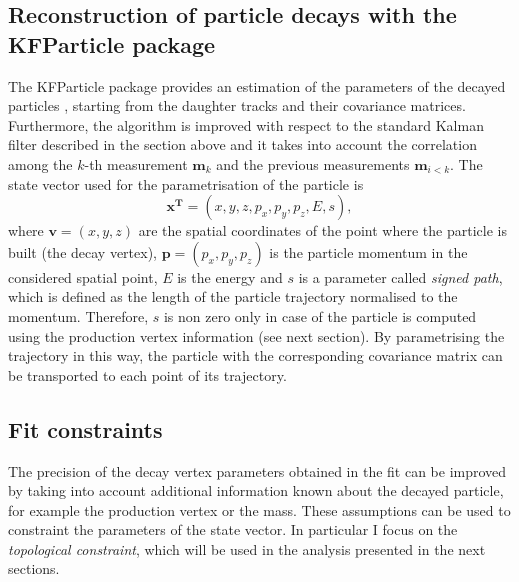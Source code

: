 \documentclass[b5paper,10pt,twoside,oldstyle,classica]{toptesi}
\begin{document}
\subsection{Reconstruction of particle decays with the KFParticle package}
\label{KFParticle_sec}
The KFParticle package provides an estimation of the parameters of the decayed particles \cite{Kisel:2006}, starting from the daughter tracks and their covariance matrices. Furthermore, the algorithm is improved with respect to the standard Kalman filter described in the section above and it takes into account the correlation among the $k$-th measurement $\pmb{m}_k$ and the previous measurements $\pmb{m}_{i<k}$. The state vector used for the parametrisation of the particle is 
\begin{equation}
 \pmb{x^T} = (x,y,z,p_x,p_y,p_z,E,s),
 \label{statevectorKF}
\end{equation}
where $\pmb{v} = (x,y,z)$ are the spatial coordinates of the point where the particle is built (the decay vertex), $\pmb{p} = (p_x,p_y,p_z)$ is the particle momentum in the considered spatial point, $E$ is the energy and $s$ is a parameter called \textit{signed path}, which is defined as the length of the particle trajectory normalised to the momentum. Therefore, $s$ is non zero only in case of the particle is computed using the production vertex information (see next section). By parametrising the trajectory in this way, the particle with the corresponding covariance matrix can be transported to each point of its trajectory. 
\subsection{Fit constraints}
The precision of the decay vertex parameters obtained in the fit can be improved by taking into account additional information known about the decayed particle, for example the production vertex or the mass. These assumptions can be used to constraint the parameters of the state vector. In particular I focus on the \textit{topological constraint}, which will be used in the analysis presented in the next sections.
\end{document}
